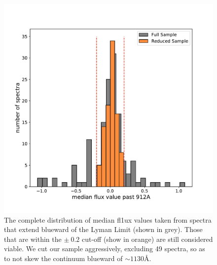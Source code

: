 \documentclass[twocolumn,tight,times]{aastex63}
\begin{document}
\begin{figure}[ht]
    \begin{center}
    \includegraphics[width=\columnwidth]{ll_hist.pdf}
    \caption{The complete distribution of median fl1ux values taken from spectra that extend blueward of the Lyman Limit (shown in grey). Those that are within the $\pm\ 0.2$ cut-off (show in orange) are still considered viable. We cut our sample aggressively, excluding 49 spectra, so as to not skew the continuum blueward of $\sim 1130$\AA.}
    \label{fig:ll_cut}
    \end{center}
\end{figure}
\end{document}
